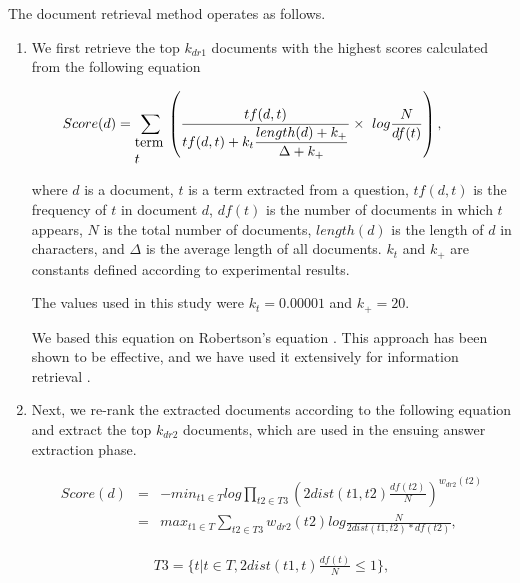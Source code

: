 The document retrieval method operates as follows.
\begin{enumerate}
\item 
We first retrieve the top $k_{dr1}$ documents with the highest scores calculated from the following
equation

{
\begin{eqnarray}
  \label{eqn:robertson}
  & \hspace*{-1cm}
 Score(d) = \displaystyle \sum_{\begin{minipage}[h]{0.8cm}
    term $t$ 
  \end{minipage}} & \hspace*{-0.3cm} \left(  \displaystyle 
\frac{tf(d,t)}{\displaystyle 
tf(d,t) + k_{t} \frac{length(d)+k_{+}}{\Delta+k_{+}}} \times \ log\frac{N}{df(t)} \right),
\end{eqnarray}}

\noindent 
where $d$ is a document, $t$ is a term extracted from a question, $tf(d,t)$ is 
the frequency of $t$ in document $d$, $df(t)$ is the number of documents 
in which $t$ appears, $N$ is the total number of documents, $length(d)$ is the length of 
$d$ in characters, and $\Delta$ is the average length of all documents. 
$k_{t}$ and $k_{+}$ are constants defined according to experimental results. 

The values used in this study were $k_{t} = 0.00001$ and $k_{+} = 20$. 

We based this equation on Robertson's equation \cite{2poisson,robertson_trec3}. This 
approach has been shown to be effective, and we have used it extensively for information retrieval 
\cite{iral2000,Murata_ntcir2,Murata_ntcir3}. 

\item 
Next, we re-rank the extracted documents according to the following equation and extract 
the top $k_{dr2}$ documents, which are used in the ensuing answer 
extraction phase. 

{
\begin{eqnarray}
  \label{eqn:ir_near}
Score(d) & = &  \displaystyle - {min}_{t1 \in T} log \prod_{t2 \in T3} 
(2dist(t1,t2)\frac{df(t2)}{N})^{w_{dr2}(t2)} \\
& = &  \displaystyle {max}_{t1 \in T} \sum_{t2 \in T3} w_{dr2}(t2) 
log 
\frac{N}{2dist(t1,t2)*df(t2)},
\end{eqnarray}}

  {
    \begin{eqnarray}
      \label{eqn:new_test4}
      T3 = \{t| t \in T, 2dist(t1,t)\frac{df(t)}{N} \leq 1\},
    \end{eqnarray}}
  

\end{enumerate}
